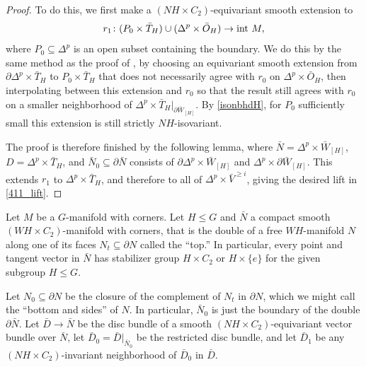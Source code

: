 \documentclass[11pt]{amsart}
\theoremstyle{definition}
\numberwithin{equation}{section}
\numberwithin{figure}{section}
\begin{document}
\begin{proof}
	To do this, we first make a $(NH \times C_2)$-equivariant smooth extension to
	\[ r_1\colon (P_0 \times \bar T_H) \cup (\Delta^p \times \bar O_H) \to \textup{int }M, \]
	where $P_0 \subseteq \Delta^p$ is an open subset containing the boundary. We do this by the same method as the proof of \cite[Prop 4.6]{GIMM1}, by choosing an equivariant smooth extension from $\partial \Delta^p \times \bar T_H$ to $P_0 \times \bar T_H$ that does not necessarily agree with $r_0$ on $\Delta^p \times \bar O_H$, then interpolating between this extension and $r_0$ so that the result still agrees with $r_0$ on a smaller neighborhood of $\Delta^p \times \bar T_H|_{\partial \bar W_{[H]}}$. By \autoref{isonbhdH}, for $P_0$ sufficiently small this extension is still strictly $NH$-isovariant.
	
	
	The proof is therefore finished by the following lemma, where $\bar N = \Delta^p \times \bar W_{[H]}$, $D = \Delta^p \times \bar T_H$, and $\bar N_0 \subseteq \partial \bar N$ consists of $\partial \Delta^p \times \bar W_{[H]}$ and $\Delta^p \times \partial \bar W_{[H]}$. This extends $r_1$ to $\Delta^p \times \bar T_H$, and therefore to all of $\Delta^p \times \bar V^{\geq i}$, giving the desired lift in \eqref{411_lift}.
\end{proof}

Let $M$ be a $G$-manifold with corners. Let $H \leq G$ and $\bar N$ a compact smooth $(WH \times C_2)$-manifold with corners, that is the double of a free $WH$-manifold $N$ along one of its faces $N_t \subseteq \partial N$ called the ``top.'' In particular, every point and tangent vector in $\bar N$ has stabilizer group $H \times C_2$ or $H \times \{e\}$ for the given subgroup $H \leq G$.

Let $N_0 \subseteq \partial N$ be the closure of the complement of $N_t$ in $\partial N$, which we might call the ``bottom and sides'' of $N$. In particular, $\bar N_0$ is just the boundary of the double $\partial \bar N$. Let $\bar D \to \bar N$ be the disc bundle of a smooth $(NH \times C_2)$-equivariant vector bundle over $\bar N$, let $\bar D_0 = \bar D|_{\bar N_0}$ be the restricted disc bundle, and let $\bar D_1$ be any $(NH \times C_2)$-invariant neighborhood of $\bar D_0$ in $\bar D$.
\end{document}
